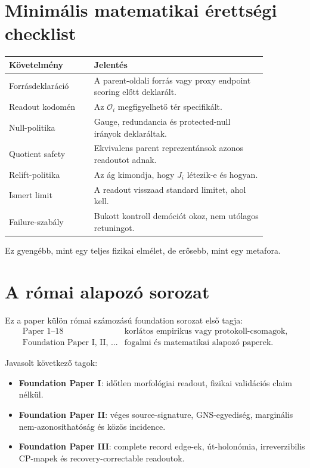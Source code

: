 \documentclass[12pt]{article}
\newcommand{\Obs}{\mathcal O}
\begin{document}
\section{Minimális matematikai érettségi checklist}

\begin{center}
\begin{tabular}{p{0.28\linewidth}p{0.58\linewidth}}
\toprule
Követelmény & Jelentés\\
\midrule
Forrásdeklaráció & A parent-oldali forrás vagy proxy endpoint scoring előtt deklarált.\\
Readout kodomén & Az \(\Obs_i\) megfigyelhető tér specifikált.\\
Null-politika & Gauge, redundancia és protected-null irányok deklaráltak.\\
Quotient safety & Ekvivalens parent reprezentánsok azonos readoutot adnak.\\
Relift-politika & Az ág kimondja, hogy \(J_i\) létezik-e és hogyan.\\
Ismert limit & A readout visszaad standard limitet, ahol kell.\\
Failure-szabály & Bukott kontroll demóciót okoz, nem utólagos retuningot.\\
\bottomrule
\end{tabular}
\end{center}

Ez gyengébb, mint egy teljes fizikai elmélet, de erősebb, mint egy metafora.

\section{A római alapozó sorozat}

Ez a paper külön római számozású foundation sorozat első tagja:
\[
\begin{array}{ll}
\text{Paper 1--18} & \text{korlátos empirikus vagy protokoll-csomagok},\\
\text{Foundation Paper I, II, ...} & \text{fogalmi és matematikai alapozó paperek}.
\end{array}
\]

Javasolt következő tagok:
\begin{itemize}
  \item \textbf{Foundation Paper I}: időtlen morfológiai readout, fizikai
  validációs claim nélkül.
  \item \textbf{Foundation Paper II}: véges source-signature, GNS-egyediség,
  marginális nem-azonosíthatóság és közös incidence.
  \item \textbf{Foundation Paper III}: complete record edge-ek, út-holonómia,
  irreverzibilis CP-mapek és recovery-correctable readoutok.
\end{itemize}
\end{document}
